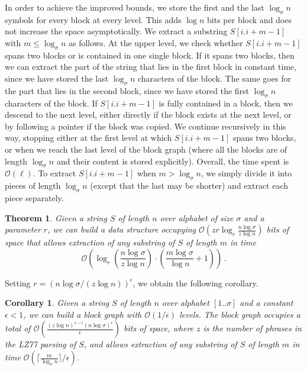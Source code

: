 \documentclass[12pt]{article}
\newcommand{\Oh}[1]
  {\ensuremath{\mathcal{O}\!\left({#1}\right)}}
\newtheorem{thrm}[obs]{Theorem}
\newtheorem{cor}[obs]{Corollary}
\begin{document}
In order to achieve the improved bounds, we store the first and the last $\log_\sigma n$ symbols for every 
block at every level. This adds $\log n$ bits per block and does not increase the space asymptotically.
We extract a substring $S [i.i + m - 1]$ with $m \leq \log_\sigma n$ as follows.      
At the upper level, we check whether $S [i.i + m - 1]$ spans two blocks or is contained in one single block. If it spans two blocks, then we can extract the part of the string that lies in the first block in 
constant time, since we have stored the last $\log_\sigma n$ characters of the block. The same goes 
for the part that lies in the second block, since we have stored the first $\log_\sigma n$ characters 
of the block. If $S [i.i + m - 1]$ is fully contained in a block, then we descend to the next level, 
either directly if the block exists at the next level, or by following a pointer if the block was 
copied.  We continue recursively in this way, stopping either at the first level at which $S [i.i + m - 1]$ spans
two blocks, or when we reach the last level of the block graph (where all the blocks are of length $\log_\sigma n$
and their content is stored explicitly). Overall, the time spent is $\Oh{\ell}$.  To extract $S [i.i + m - 1]$ when \(m > \log_\sigma n\), we simply divide it into pieces of length \(\log_\sigma n\) (except that the last may be shorter) and extract each piece separately.

\begin{thrm}
Given a string $S$ of length $n$ over alphabet of size $\sigma$ and a parameter
$r$, we can build a data structure occupying $\Oh{zr\log_r \frac{n\log\sigma}{z\log n}}$ 
bits of space that allows extraction of any substring of $S$ of length $m$
in time
\[\Oh{\log_r \left( \frac{n\log\sigma}{z\log n} \right) \cdot \left( \frac{m \log \sigma}{\log n} +1 \right)}\,.\]
\end{thrm}

Setting $r = (n\log\sigma/(z\log n))^\epsilon$, we obtain the following corollary.

\begin{cor}
Given a string $S$ of length $n$ over alphabet $[1..\sigma]$ and a constant
$\epsilon<1$, we can build a block graph with $\Oh{1/\epsilon}$  levels.
The block graph occupies a total of $\Oh{\frac{(z\log n)^{1-\epsilon}(n\log\sigma)^\epsilon}{\epsilon}}$ bits of space,
where $z$ is the number of phrases in the LZ77 parsing of $S$,
and allows extraction of any substring of $S$ of length $m$
in time $\Oh{\lceil\frac{m}{\log_\sigma n}\rceil/\epsilon}$.
\end{cor}
\end{document}
